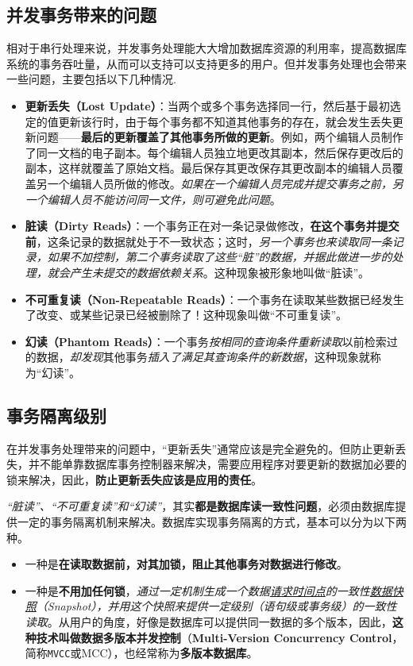 \documentclass[UTF8,a4paper,12pt]{ctexbook}
\begin{document}
		
		\subsection{并发事务带来的问题}
			相对于串行处理来说，并发事务处理能大大增加数据库资源的利用率，提高数据库系统的事务吞吐量，从而可以支持可以支持更多的用户。但并发事务处理也会带来一些问题，主要包括以下几种情况.
			
			\begin{itemize}
				\item \textbf{更新丢失（Lost Update）}：当两个或多个事务选择同一行，然后基于最初选定的值更新该行时，由于每个事务都不知道其他事务的存在，就会发生丢失更新问题——\textbf{最后的更新覆盖了其他事务所做的更新}。例如，两个编辑人员制作了同一文档的电子副本。每个编辑人员独立地更改其副本，然后保存更改后的副本，这样就覆盖了原始文档。最后保存其更改保存其更改副本的编辑人员覆盖另一个编辑人员所做的修改。\textit{如果在一个编辑人员完成并提交事务之前，另一个编辑人员不能访问同一文件，则可避免此问题}。
				\item \textbf{脏读（Dirty Reads）}：一个事务正在对一条记录做修改，\textbf{在这个事务并提交前}，这条记录的数据就处于不一致状态；这时，\textit{另一个事务也来读取同一条记录，如果不加控制，第二个事务读取了这些“脏”的数据，并据此做进一步的处理，就会产生未提交的数据依赖关系}。这种现象被形象地叫做“脏读”。
				\item \textbf{不可重复读（Non-Repeatable Reads）}：一个事务在读取某些数据已经发生了改变、或某些记录已经被删除了！这种现象叫做“不可重复读”。
				\item \textbf{幻读（Phantom Reads）}：一个事务\textit{按相同的查询条件重新读取}以前检索过的数据，\textit{却发现}其他事务\textit{插入了满足其查询条件的新数据}，这种现象就称为“幻读”。
			\end{itemize}
		
		
		\subsection{事务隔离级别}
			在并发事务处理带来的问题中，“更新丢失”通常应该是完全避免的。但防止更新丢失，并不能单靠数据库事务控制器来解决，需要应用程序对要更新的数据加必要的锁来解决，因此，\textbf{防止更新丢失应该是应用的责任}。
			
			\textit{“脏读”、“不可重复读”和“幻读”}，其实\textbf{都是数据库读一致性问题}，必须由数据库提供一定的事务隔离机制来解决。数据库实现事务隔离的方式，基本可以分为以下两种。
			
			\begin{itemize}
				\item 一种是\textbf{在读取数据前，对其加锁，阻止其他事务对数据进行修改}。
				\item 一种是\textbf{不用加任何锁}，\textit{通过一定机制生成一个数据\underline{请求时间点}的一致性\underline{数据快照}（Snapshot），并用这个快照来提供一定级别（语句级或事务级）的一致性读取}。从用户的角度，好像是数据库可以提供同一数据的多个版本，因此，\textbf{这种技术叫做数据多版本并发控制}（\textbf{Multi-Version Concurrency Control}，简称\verb|MVCC|或MCC），也经常称为\textbf{多版本数据库}。
			\end{itemize}
			
\end{document}
